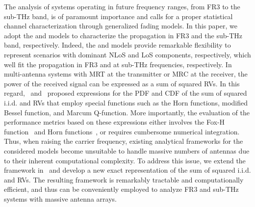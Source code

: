 \documentclass[journal,twocolumn]{IEEEtran}
\begin{document}
The analysis of systems operating in future frequency ranges, from FR3 to the sub-THz band, is of paramount importance and calls for a proper statistical channel characterization through generalized fading models. In this paper, we adopt the \Ehm{} and \km{} models to characterize the propagation in FR3 and the sub-THz band, respectively. Indeed, the \Ehm{} and \km{} models provide remarkable flexibility to represent scenarios with dominant \ac{NLoS} and \ac{LoS} components, respectively, which well fit the propagation in FR3 and at sub-THz frequencies, respectively. In multi-antenna systems with \ac{MRT} at the transmitter or \ac{MRC} at the receiver, the power of the received signal can be expressed as a sum of squared RVs. In this regard,~\cite{Bad21} and~\cite{Mil08} proposed expressions for the \ac{PDF} and \ac{CDF} of the sum of squared \ac{i.i.d.} \Ehm{} and \km{} \acp{RV} that employ special functions such as the Horn functions, modified Bessel function, and Marcum Q-function. More importantly, the evaluation of the performance metrics based on these expressions either involves the Fox-H function~\cite{Bad21} and Horn functions~\cite{Dix23}, or requires cumbersome numerical integration. Thus, when raising the carrier frequency, existing analytical frameworks for the considered models become unsuitable to handle massive numbers of antennas due to their inherent computational complexity. To address this issue, we extend the framework in~\cite{Alm23a} and develop a new exact representation of the sum of squared \ac{i.i.d.} \Ehm{} and \km{} \acp{RV}. The resulting framework is remarkably tractable and computationally efficient, and thus can be conveniently employed to analyze FR3 and sub-THz systems with massive antenna arrays.
\end{document}
